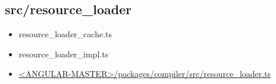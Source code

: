 \subsection{src/resource\_loader}


\begin{itemize}
  \item resource\_loader\_cache.ts
  \item resource\_loader\_impl.ts
\end{itemize}


\begin{itemize}
  \item \href{https://github.com/angular/angular/blob/master/packages/compiler/src/resource_loader.ts}
        {<ANGULAR-MASTER>/packages/compiler/src/resource\_loader.ts}
\end{itemize}









